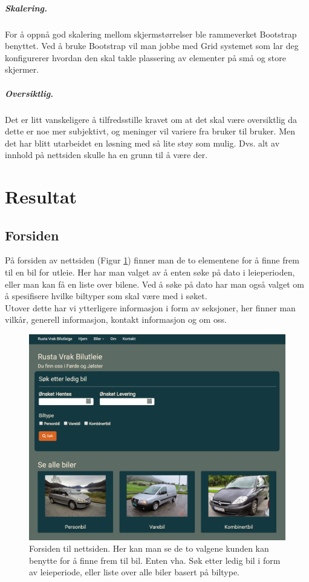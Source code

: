 \subparagraph*{Skalering.}
For å oppnå god skalering mellom skjermstørrelser ble rammeverket Bootstrap benyttet. Ved å bruke Bootstrap vil man jobbe med Grid systemet som lar deg konfigurerer hvordan den skal takle plassering av elementer på små og store skjermer. 

\subparagraph*{Oversiktlig.}
Det er litt vanskeligere å tilfredsstille kravet om at det skal være oversiktlig da dette er noe mer subjektivt, og meninger vil variere fra bruker til bruker. Men det har blitt utarbeidet en løsning med så lite støy som mulig. Dvs. alt av innhold på nettsiden skulle ha en grunn til å være der. 

\newpage
\section{Resultat}

\subsection{Forsiden}
På forsiden av nettsiden (Figur \ref{fig:rv_frontpage}) finner man de to elementene for å finne frem til en bil for utleie. Her har man valget av å enten søke på dato i leieperioden, eller man kan få en liste over bilene. Ved å søke på dato har man også valget om å spesifisere hvilke biltyper som skal være med i søket. \\

Utover dette har vi ytterligere informasjon i form av seksjoner, her finner man vilkår, generell informasjon, kontakt informasjon og om oss.

 \begin{figure}[htbp]
	\centering
		\includegraphics[scale=0.4]{Bilder/rv_frontpage.png}
	\caption[Forsiden til Nettsiden]{Forsiden til nettsiden. Her kan man se de to valgene kunden kan benytte for å finne frem til bil. Enten vha. Søk etter ledig bil i form av leieperiode, eller liste over alle biler basert på biltype.} %
	\label{fig:rv_frontpage}
\end{figure}


